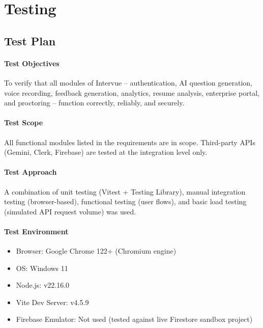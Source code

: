 \chapter{Testing}

\section{Test Plan}

\subsubsection*{Test Objectives}
To verify that all modules of Intervue -- authentication, AI question generation, voice recording, feedback generation, analytics, resume analysis, enterprise portal, and proctoring -- function correctly, reliably, and securely.

\subsubsection*{Test Scope}
All functional modules listed in the requirements are in scope. Third-party APIs (Gemini, Clerk, Firebase) are tested at the integration level only.

\subsubsection*{Test Approach}
A combination of unit testing (Vitest + Testing Library), manual integration testing (browser-based), functional testing (user flows), and basic load testing (simulated API request volume) was used.

\subsubsection*{Test Environment}
\begin{itemize}
	\item Browser: Google Chrome 122+ (Chromium engine)
	\item OS: Windows 11
	\item Node.js: v22.16.0
	\item Vite Dev Server: v4.5.9
	\item Firebase Emulator: Not used (tested against live Firestore sandbox project)
\end{itemize}

